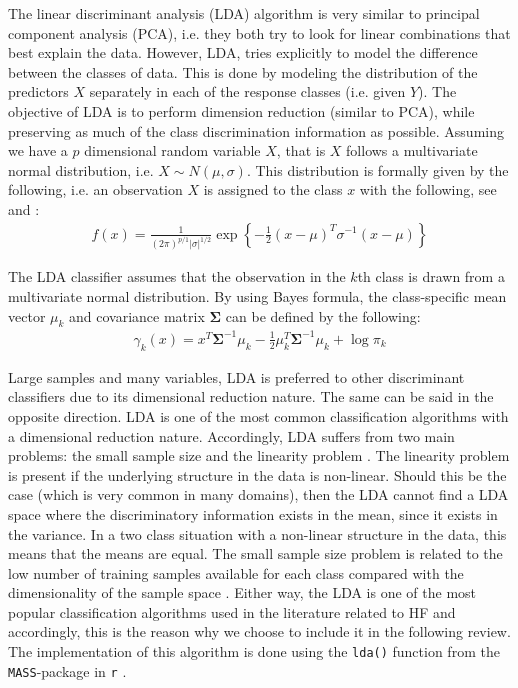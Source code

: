 \documentclass[../thesis.tex]{subfiles}
\begin{document}
\noindent The linear discriminant analysis (LDA) algorithm is very similar to principal component analysis (PCA), i.e. they both try to look for linear combinations that best explain the data. However, LDA, tries explicitly to model the difference between the classes of data. This is done by modeling the distribution of the predictors $X$ separately in each of the response classes (i.e. given $Y$). The objective of LDA is to perform dimension reduction (similar to PCA), while preserving as much of the class discrimination information as possible. Assuming we have a $p$ dimensional random variable $X$, that is $X$ follows a multivariate normal distribution, i.e. $X \sim N(\mu,\sigma)$. This distribution is formally given by the following, i.e. an observation $X$ is assigned to the class $x$ with the following, see \cite{friedman2009elements} and \cite{james2013introduction}:
\begin{align}
    f(x) = \frac{1}{(2\pi)^{p / 1}|\sigma|^{1/2}} \exp\left \{-\frac{1}{2}(x-\mu)^T \sigma^{-1} (x - \mu) \right \}
\end{align}

\noindent The LDA classifier assumes that the observation in the $k$th class is drawn from a multivariate normal distribution. By using Bayes formula, the class-specific mean vector $\mu_k$ and covariance matrix $\boldsymbol{\Sigma}$ can be defined by the following:
\newpage
\begin{align}
    \gamma_k (x) = x^T\boldsymbol{\Sigma}^{-1} \mu_k - \frac{1}{2}\mu_k^T\boldsymbol{\Sigma}^{-1} \mu_k + \log \pi_k
\end{align}

\noindent Large samples and many variables, LDA is preferred to other discriminant classifiers due to its dimensional reduction nature. The same can be said in the opposite direction. LDA is one of the most common classification algorithms with a dimensional reduction nature. Accordingly, LDA suffers from two main problems: the small sample size and the linearity problem \citep{tharwat2017linear}. The linearity problem is present if the underlying structure in the data is non-linear. Should this be the case (which is very common in many domains), then the LDA cannot find a LDA space where the discriminatory information exists in the mean, since it exists in the variance. In a two class situation with a non-linear structure in the data, this means that the means are equal. The small sample size problem is related to the low number of training samples available for each class compared with the dimensionality of the sample space \citep{tharwat2017linear}. Either way, the LDA is one of the most popular classification algorithms used in the literature related to HF and accordingly, this is the reason why we choose to include it in the following review. The implementation of this algorithm is done using the \texttt{lda()} function from the \texttt{MASS}-package in \texttt{r} \citep{MASS}.
\end{document}
